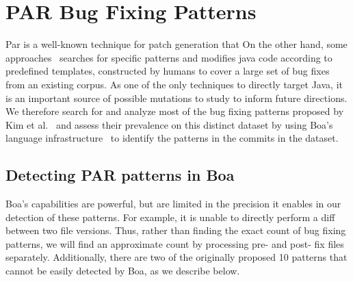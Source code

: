 \documentclass{sig-alternate-05-2015}
\begin{document}
\section{PAR Bug Fixing Patterns}\label{sec:method}

Par is a well-known technique for patch generation that 
On the other hand, some approaches~\cite{kim2013} searches for specific patterns
and modifies java code according to predefined templates, constructed by humans
to cover a large set of bug fixes from an existing corpus.  As one of the only
techniques to directly target Java, it is an important source of possible
mutations to study to inform future directions. 
We therefore search for and analyze most of the bug fixing patterns proposed by
Kim et al.~\cite{kim2013} and assess their prevalence on this distinct
dataset by using Boa's language infrastructure~\cite{dyer2013} to identify the patterns
in the commits in the dataset.


\subsection{Detecting PAR patterns in Boa}

Boa's capabilities are powerful, but are limited in the precision it enables in
our detection of these patterns. For example, it is unable to directly perform a
diff between two file versions. Thus, rather than finding the exact count of
bug fixing patterns, we will find an approximate count by processing pre- and
post- fix files separately.  Additionally, there are
two of the originally proposed 10 patterns that cannot be easily detected by
Boa, as we describe below. 
\end{document}
